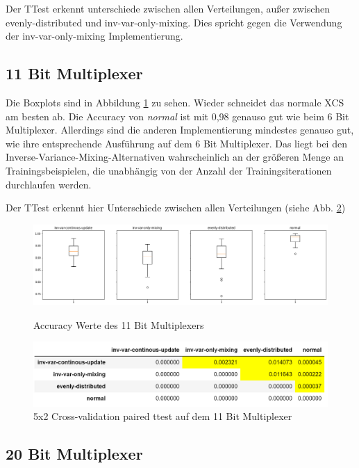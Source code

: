 \documentclass{ocsmnar}
\begin{document}
Der TTest erkennt unterschiede zwischen allen Verteilungen, außer zwischen evenly-distributed und inv-var-only-mixing. Dies spricht gegen die Verwendung der inv-var-only-mixing Implementierung.

\subsection{11 Bit Multiplexer}

Die Boxplots sind in Abbildung \ref{boxplot-11-bit} zu sehen. Wieder schneidet das normale XCS am besten ab. Die Accuracy von \textit{normal} ist mit 0,98 genauso gut wie beim 6 Bit Multiplexer. Allerdings sind die anderen Implementierung mindestes genauso gut, wie ihre entsprechende Ausführung auf dem 6 Bit Multiplexer.  Das liegt bei den Inverse-Variance-Mixing-Alternativen wahrscheinlich an der größeren Menge an Trainingsbeispielen, die unabhängig von der Anzahl der Trainingsiterationen durchlaufen werden. 

Der TTest erkennt hier Unterschiede zwischen allen Verteilungen (siehe Abb. \ref{ttest-11-bit})

\begin{figure}[h]
    \includegraphics[width=\linewidth]{img/boxplot_11_bit.png}
    \caption{Accuracy Werte des 11 Bit Multiplexers}\label{boxplot-11-bit}
    \label{boxplot-11-bit}
\end{figure}

\begin{figure}[h]
    \includegraphics[width=\linewidth]{img/ttest_11_bit.png}
    \caption{5x2 Cross-validation paired ttest auf dem 11 Bit Multiplexer}\label{ttest-11-bit}
\end{figure}

\subsection{20 Bit Multiplexer}
\end{document}
